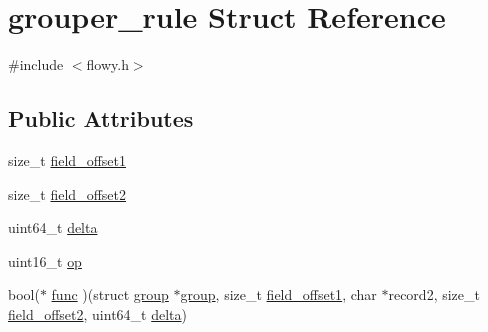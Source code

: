 \hypertarget{structgrouper__rule}{\section{grouper\-\_\-rule \-Struct \-Reference}
\label{structgrouper__rule}
}


{\ttfamily \#include $<$flowy.\-h$>$}

\subsection*{\-Public \-Attributes}
\begin{DoxyCompactItemize}
\item 
size\-\_\-t \hyperlink{structgrouper__rule_a5ff78535dda1b91d4f54c6fc55cdf979}{field\-\_\-offset1}
\item 
size\-\_\-t \hyperlink{structgrouper__rule_a949e21775eafc77f3785fd934e72d330}{field\-\_\-offset2}
\item 
uint64\-\_\-t \hyperlink{structgrouper__rule_a5cfd512aa4238698edebde1fc322d2bf}{delta}
\item 
uint16\-\_\-t \hyperlink{structgrouper__rule_a1b4321526398f84c13b8c9206a64f84a}{op}
\item 
bool($\ast$ \hyperlink{structgrouper__rule_a062edda43f48c3491339ebceae48a899}{func} )(struct \hyperlink{structgroup}{group} $\ast$\hyperlink{structgroup}{group}, size\-\_\-t \hyperlink{structgrouper__rule_a5ff78535dda1b91d4f54c6fc55cdf979}{field\-\_\-offset1}, char $\ast$record2, size\-\_\-t \hyperlink{structgrouper__rule_a949e21775eafc77f3785fd934e72d330}{field\-\_\-offset2}, uint64\-\_\-t \hyperlink{structgrouper__rule_a5cfd512aa4238698edebde1fc322d2bf}{delta})
\end{DoxyCompactItemize}


